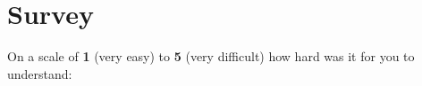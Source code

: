\documentclass[english,a4paper,oneside,print_questionnaire_id]{sdaps}
\begin{document}
\begin{questionnaire}[noinfo]
\begin{minipage}{0.3\textwidth}
\begin{choicegroup}{}
            \end{choicegroup}

        \end{minipage}%
        \hspace{0.2\textwidth}%
        \begin{minipage}{0.3\textwidth}

            \begin{choicegroup}{}



            \end{choicegroup}

        \end{minipage}

    \section{Survey}

		On a scale of \textbf{1} (very easy) to \textbf{5} (very difficult) how hard was it for you to understand:

		\begin{choicegroup}{}


		
		\end{choicegroup}
    \end{questionnaire}
\end{document}
